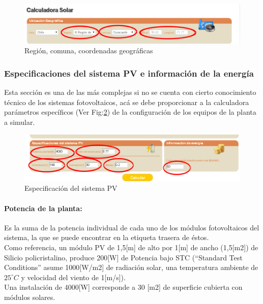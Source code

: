\begin{figure}[ht]
	\centering
	\includegraphics[scale=0.5]{./images/cap5chap1img7-2}
	\caption{Región, comuna, coordenadas geográficas}
	\label{region}
\end{figure}

\subsubsection{Especificaciones del sistema PV e información de la energía}
Esta sección es una de las más complejas si no se cuenta con cierto conocimiento técnico de los sistemas fotovoltaicos, acá se debe proporcionar a la calculadora parámetros específicos (Ver Fig:\ref{sistemaPv}) de la configuración de los equipos de la planta a simular.\\

\begin{figure}[h]
        \centering
        \includegraphics[scale=0.4]{./images/cap5chap1img8}
        \caption{Especificación del sistema PV}
        \label{sistemaPv}
\end{figure}

\paragraph{Potencia de la planta:} Es la suma de la potencia individual de cada uno de los módulos fotovoltaicos del sistema, la que se puede encontrar en la etiqueta trasera de éstos.\\
Como referencia, un módulo PV de 1,5[m] de alto por 1[m] de ancho (1,5[m2]) de Silicio policristalino, produce 200[W] de Potencia bajo STC (“Standard Test Conditions” asume 1000[W/m2] de radiación solar, una temperatura ambiente de $25^\circ C$ y velocidad del viento de 1[m/s]).\\ Una instalación de 4000[W] corresponde a 30 [m2] de superficie cubierta con módulos solares.
 
